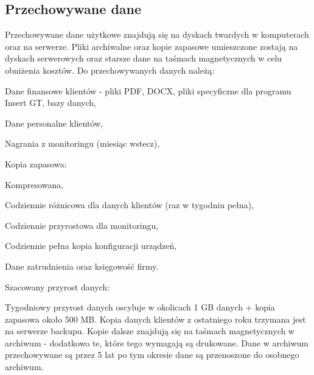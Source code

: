 \newpage
\subsection{Przechowywane dane}
Przechowywane dane użytkowe znajdują się na dyskach twardych \linebreak w komputerach oraz na serwerze. Pliki archiwalne oraz kopie zapasowe umieszczone zostają na dyskach serwerowych oraz starsze dane na taśmach magnetycznych w celu obniżenia kosztów. Do przechowywanych danych \linebreak należą:

\hspace{-0.5cm}\begin{minipage}{13.5cm}
	\begin{itemize*}
		\item Dane finansowe klientów - pliki PDF, DOCX, pliki specyficzne dla programu Insert GT, bazy danych,
		\item Dane personalne klientów,
		\item Nagrania z monitoringu (miesiąc wstecz),
		\item Kopia zapasowa:
		\begin{itemize*}
			\item Kompresowana,
			\item Codziennie różnicowa dla danych klientów (raz w tygodniu pełna),
			\item Codziennie przyrostowa dla monitoringu,
			\item Codziennie pełna kopia konfiguracji urządzeń,
		\end{itemize*}
		\item Dane zatrudnienia oraz księgowość firmy.
	\end{itemize*}
\end{minipage}

Szacowany przyrost danych:

Tygodniowy przyrost danych oscyluje w okolicach 1 GB danych + kopia zapasowa około 500 MB. Kopia danych klientów z ostatniego roku trzymana jest na serwerze backupu. Kopie dalsze znajdują się na taśmach magnetycznych w archiwum - dodatkowo te, które tego wymagają są drukowane. Dane w archiwum przechowywane są przez 5 lat po tym okresie dane są przenoszone do osobnego archiwum.

